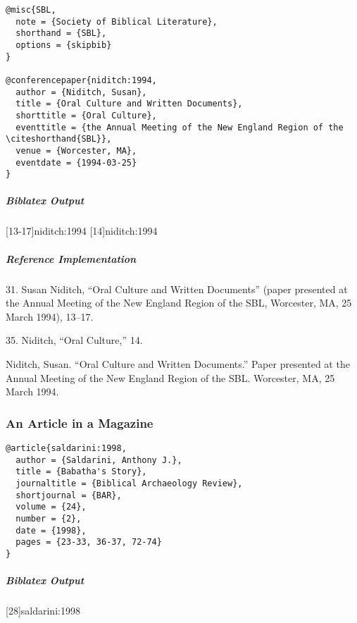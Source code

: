 \documentclass[a4paper]{article}
\newenvironment{biboutput}{%
  \subparagraph{Biblatex Output}
}{\color{black}}
\newenvironment{refimp}{%
  \subparagraph{Reference Implementation}
  \color{reference-colour}
  \rm
}{\par\color{black}}
\begin{document}
\begin{lstlisting}
@misc{SBL,
  note = {Society of Biblical Literature},
  shorthand = {SBL},
  options = {skipbib}
}

@conferencepaper{niditch:1994,
  author = {Niditch, Susan},
  title = {Oral Culture and Written Documents},
  shorttitle = {Oral Culture},
  eventtitle = {the Annual Meeting of the New England Region of the \citeshorthand{SBL}},
  venue = {Worcester, MA},
  eventdate = {1994-03-25}
}
\end{lstlisting}

\begin{biboutput}
  [13-17]{niditch:1994}
  [14]{niditch:1994}
\end{biboutput}

\begin{refimp}
  \hspace*{\bibindent}31. Susan Niditch, “Oral Culture and Written Documents”
  (paper presented at the Annual Meeting of the New England Region of the SBL,
  Worcester, MA, 25 March 1994), 13–17.

  \hspace*{\bibindent}35. Niditch, “Oral Culture,” 14.

  \hangindent\bibindent Niditch, Susan. “Oral Culture and Written Documents.”
  Paper presented at the Annual Meeting of the New England Region of the SBL.
  Worcester, MA, 25 March 1994.

\end{refimp}

\subsubsection{An Article in a Magazine}

\begin{lstlisting}
@article{saldarini:1998,
  author = {Saldarini, Anthony J.},
  title = {Babatha's Story},
  journaltitle = {Biblical Archaeology Review},
  shortjournal = {BAR},
  volume = {24},
  number = {2},
  date = {1998},
  pages = {23-33, 36-37, 72-74}
}
\end{lstlisting}  

\begin{biboutput}
  [28]{saldarini:1998}
\end{biboutput}
\end{document}
